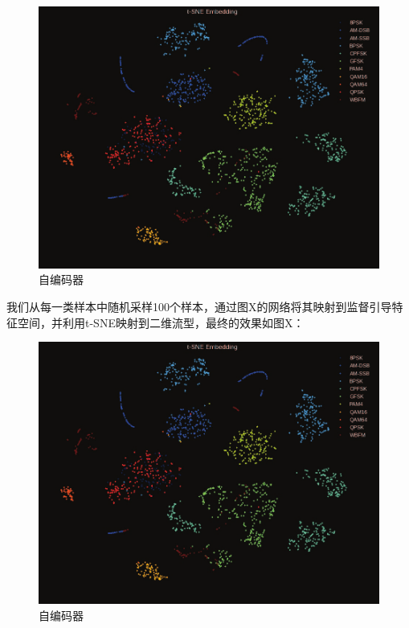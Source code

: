 \begin{figure}[!h]
	\centering
	\includegraphics[scale=0.2]{figures/chapter_3/surprised_fea}
	\caption{自编码器}	\label{sec:fig_3_6}
\end{figure}

我们从每一类样本中随机采样100个样本，通过图X的网络将其映射到监督引导特征空间，并利用t-SNE映射到二维流型，最终的效果如图X：

\begin{figure}[!h]
	\centering
	\includegraphics[scale=0.2]{figures/chapter_3/surprised_fea}
	\caption{自编码器}	\label{sec:fig_3_7}
\end{figure}

